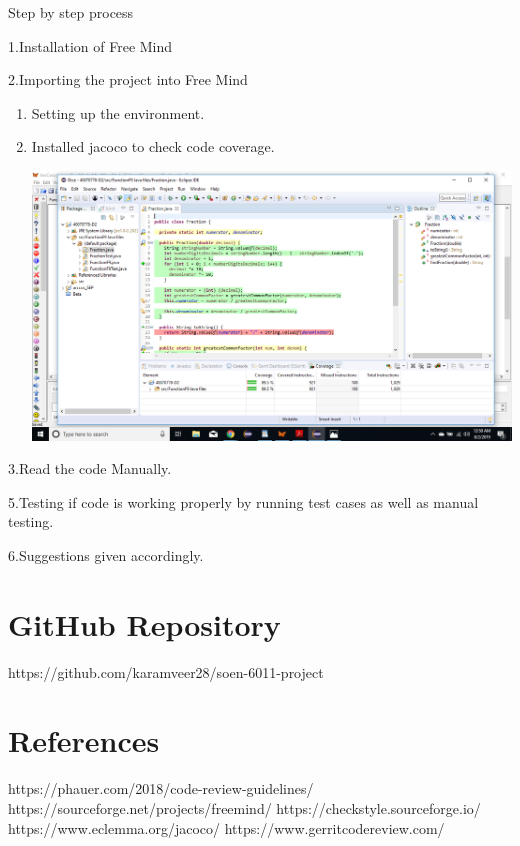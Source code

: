 \documentclass[
	12pt, %
]{fphw}
\begin{document}

\begin{problem}
Step by step process
\end{problem}
\item 1.Installation of Free Mind
\item 2.Importing the project into Free Mind
	\begin{enumerate} %
		\item Setting up the environment.
		\item Installed jacoco to check code coverage.
		\begin{center} \includegraphics[width=0.5\columnwidth]{JacocoSarkar.png} %
\end{center}
	\end{enumerate}

\item 3.Read the code Manually.
\item 5.Testing if code is working properly by running test cases as well as manual testing.
\item 6.Suggestions given accordingly.
\section{GitHub Repository}
https://github.com/karamveer28/soen-6011-project
\section{References}
https://phauer.com/2018/code-review-guidelines/
\newline
https://sourceforge.net/projects/freemind/
\newline
https://checkstyle.sourceforge.io/
\newline
https://www.eclemma.org/jacoco/
\newline
https://www.gerritcodereview.com/
\newline
\end{document}
